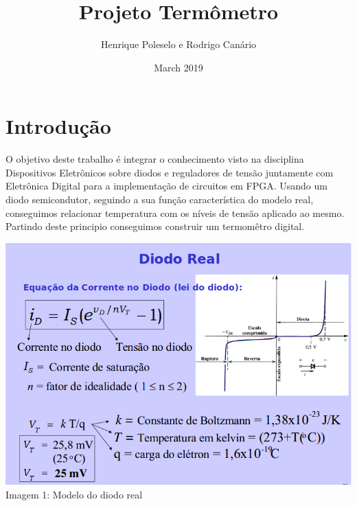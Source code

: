 \documentclass{article}
\title{Projeto Termômetro}
\author{Henrique Poleselo e Rodrigo Canário}
\date{March 2019}
\begin{document}
\maketitle

\section{Introdução}
O objetivo deste trabalho é integrar o conhecimento visto na disciplina Dispositivos Eletrônicos sobre diodos e reguladores de tensão juntamente com Eletrônica Digital para a implementação de circuitos em FPGA.
Usando um diodo semicondutor, seguindo a sua função característica do modelo real, conseguimos relacionar temperatura com os níveis de tensão aplicado ao mesmo. Partindo deste principio conseguimos construir um termomêtro digital.

\begin{center}
    \includegraphics[scale=0.5]{images/img1.png}
    Imagem 1: Modelo do diodo real
\end{center}
\end{document}
